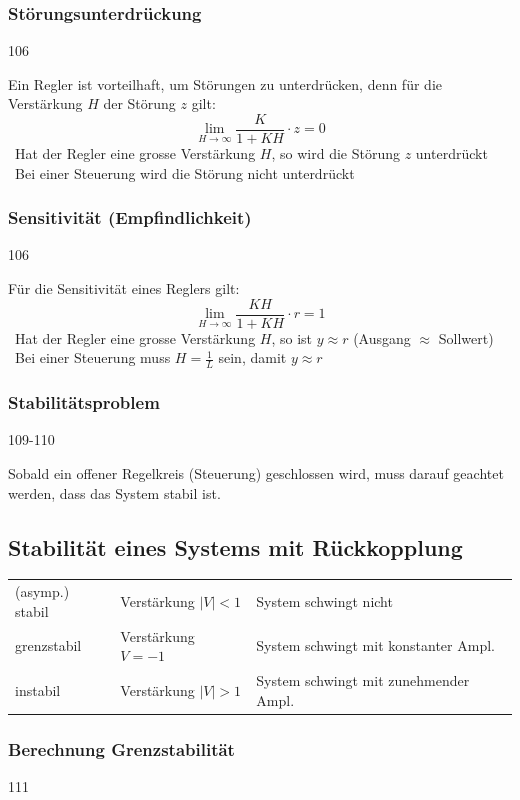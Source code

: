 \subsubsection{Störungsunterdrückung}{106}

    Ein Regler ist vorteilhaft, um Störungen zu unterdrücken, denn für die Verstärkung $H$ der Störung $z$ gilt:
    $$ \lim\limits_{H \to \infty} \frac{K}{1 + K H} \cdot z = 0 $$
    \textrightarrow\ Hat der Regler eine grosse Verstärkung $H$, so wird die Störung $z$ unterdrückt\\
    \textrightarrow\ Bei einer Steuerung wird die Störung nicht unterdrückt


\subsubsection{Sensitivität (Empfindlichkeit)}{106}

    Für die Sensitivität eines Reglers gilt:
    $$ \lim\limits_{H \to \infty} \frac{K H}{1 + K H} \cdot r = 1 $$
    \textrightarrow\ Hat der Regler eine grosse Verstärkung $H$, so ist $y \approx r$ (Ausgang $\approx$ Sollwert)\\
    \textrightarrow\ Bei einer Steuerung muss $H = \frac{1}{L}$ sein, damit $y \approx r$


\subsubsection{Stabilitätsproblem}{109-110}

    Sobald ein offener Regelkreis (Steuerung) geschlossen wird, muss darauf geachtet werden, dass das System stabil ist.
    

\subsection{Stabilität eines Systems mit Rückkopplung}

    \begin{tabular}{lll}
        (asymp.) stabil     & Verstärkung $|V| < 1$ & System schwingt nicht \\
        grenzstabil         & Verstärkung $V = -1$  & System schwingt mit konstanter Ampl.\\
        instabil            & Verstärkung $|V| > 1$ & System schwingt mit zunehmender Ampl. 
    \end{tabular}


\subsubsection{Berechnung Grenzstabilität}{111}

